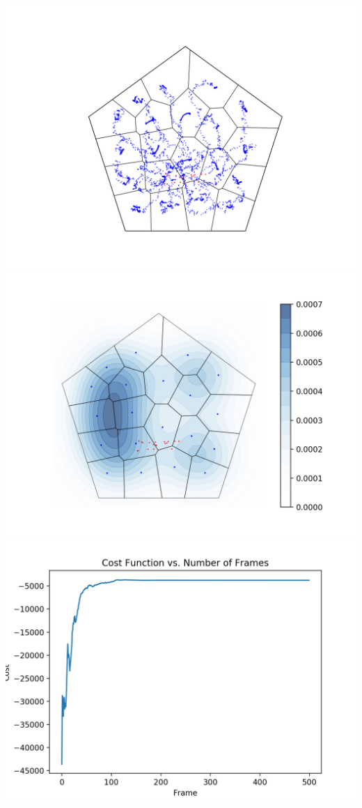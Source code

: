 \documentclass[10pt,conference]{IEEEtran}
\begin{document}
\begin{center}
	\includegraphics[scale=.2]{poster_sim2_tracking}
	\includegraphics[scale=.2]{poster_sim2_final}
	\includegraphics[scale=.2]{poster_sim2_cost_}

\end{center}
\end{document}
